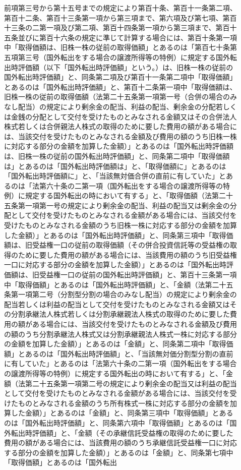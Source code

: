 \documentclass[twocolumn,a4j,10pt]{ltjtarticle}
\begin{document}
\begin{description}
\item[]前項第三号から第十五号までの規定により第百十条、第百十一条第二項、第百十二条、第百十三条第一項から第三項まで、第六項及び第七項、第百十三条の二第一項及び第二項、第百十四条第一項から第三項まで、第百十五条並びに第百十六条の規定に準じて計算する場合には、第百十条第一項中「取得価額は、旧株一株の従前の取得価額」とあるのは「第百七十条第五項第三号（国外転出をする場合の譲渡所得等の特例）に規定する国外転出時評価額（以下「国外転出時評価額」という。）は、旧株一株の従前の国外転出時評価額」と、同条第二項及び第百十一条第二項中「取得価額」とあるのは「国外転出時評価額」と、第百十二条第一項中「取得価額は、旧株一株の従前の取得価額（法第二十五条第一項第一号（合併の場合のみなし配当）の規定により剰余金の配当、利益の配当、剰余金の分配若しくは金銭の分配として交付を受けたものとみなされる金額又はその合併法人株式若しくは合併親法人株式の取得のために要した費用の額がある場合には、当該交付を受けたものとみなされる金額及び費用の額のうち旧株一株に対応する部分の金額を加算した金額）」とあるのは「国外転出時評価額は、旧株一株の従前の国外転出時評価額」と、同条第二項中「取得価額は」とあるのは「国外転出時評価額は」と、「取得価額に」とあるのは「国外転出時評価額に」と、「当該無対価合併の直前に有していた」とあるのは「法第六十条の二第一項（国外転出をする場合の譲渡所得等の特例）に規定する国外転出の時において有する」と、「取得価額（法第二十五条第一項第一号の規定により剰余金の配当、利益の配当又は剰余金の分配として交付を受けたものとみなされる金額がある場合には、当該交付を受けたものとみなされる金額のうち旧株一株に対応する部分の金額を加算した金額）」とあるのは「国外転出時評価額」と、同条第三項中「取得価額は、旧受益権一口の従前の取得価額（その併合投資信託等の受益権の取得のために要した費用の額がある場合には、当該費用の額のうち旧受益権一口に対応する部分の金額を加算した金額）」とあるのは「国外転出時評価額は、旧受益権一口の従前の国外転出時評価額」と、第百十三条第一項中「取得価額」とあるのは「国外転出時評価額」と、「金額（法第二十五条第一項第二号（分割型分割の場合のみなし配当）の規定により剰余金の配当若しくは利益の配当として交付を受けたものとみなされる金額又はその分割承継法人株式若しくは分割承継親法人株式の取得のために要した費用の額がある場合には、当該交付を受けたものとみなされる金額及び費用の額のうち分割承継法人株式又は分割承継親法人株式一株に対応する部分の金額を加算した金額）」とあるのは「金額」と、同条第二項中「取得価額」とあるのは「国外転出時評価額」と、「当該無対価分割型分割の直前に有していた」とあるのは「法第六十条の二第一項（国外転出をする場合の譲渡所得等の特例）に規定する国外転出の時において有する」と、「金額（法第二十五条第一項第二号の規定により剰余金の配当又は利益の配当として交付を受けたものとみなされる金額がある場合には、当該交付を受けたものとみなされる金額のうち所有株式一株に対応する部分の金額を加算した金額）」とあるのは「金額」と、同条第三項中「取得価額」とあるのは「国外転出時評価額」と、同条第六項中「取得価額」とあるのは「国外転出時評価額」と、「金額（その承継信託受益権の取得のために要した費用の額がある場合には、当該費用の額のうち承継信託受益権一口に対応する部分の金額を加算した金額）」とあるのは「金額」と、同条第七項中「取得価額」とあるのは「国外転出
\end{description}
\end{document}
